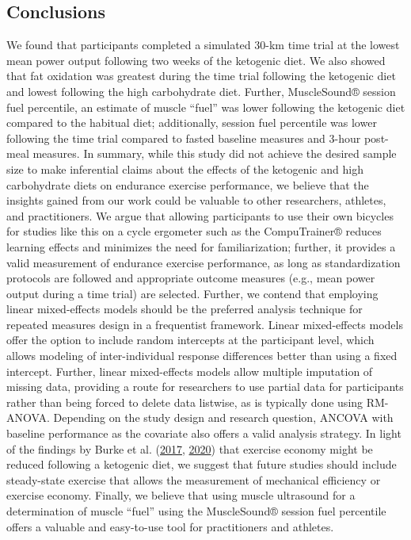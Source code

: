 \documentclass[]{cik}%
\begin{document}
\hypertarget{conclusions}{%
\subsection{Conclusions}\label{conclusions}}

We found that participants completed a simulated 30-km time trial at the
lowest mean power output following two weeks of the ketogenic diet. We
also showed that fat oxidation was greatest during the time trial
following the ketogenic diet and lowest following the high carbohydrate
diet. Further, MuscleSound® session fuel percentile, an estimate of
muscle ``fuel'' was lower following the ketogenic diet compared to the
habitual diet; additionally, session fuel percentile was lower following
the time trial compared to fasted baseline measures and 3-hour post-meal
measures. In summary, while this study did not achieve the desired
sample size to make inferential claims about the effects of the
ketogenic and high carbohydrate diets on endurance exercise performance,
we believe that the insights gained from our work could be valuable to
other researchers, athletes, and practitioners. We argue that allowing
participants to use their own bicycles for studies like this on a cycle
ergometer such as the CompuTrainer® reduces learning effects and
minimizes the need for familiarization; further, it provides a valid
measurement of endurance exercise performance, as long as
standardization protocols are followed and appropriate outcome measures
(e.g., mean power output during a time trial) are selected. Further, we
contend that employing linear mixed-effects models should be the
preferred analysis technique for repeated measures design in a
frequentist framework. Linear mixed-effects models offer the option to
include random intercepts at the participant level, which allows
modeling of inter-individual response differences better than using a
fixed intercept. Further, linear mixed-effects models allow multiple
imputation of missing data, providing a route for researchers to use
partial data for participants rather than being forced to delete data
listwise, as is typically done using RM-ANOVA. Depending on the study
design and research question, ANCOVA with baseline performance as the
covariate also offers a valid analysis strategy. In light of the
findings by Burke et al. (\protect\hyperlink{ref-19}{2017},
\protect\hyperlink{ref-20}{2020}) that exercise economy might be reduced
following a ketogenic diet, we suggest that future studies should
include steady-state exercise that allows the measurement of mechanical
efficiency or exercise economy. Finally, we believe that using muscle
ultrasound for a determination of muscle ``fuel'' using the MuscleSound®
session fuel percentile offers a valuable and easy-to-use tool for
practitioners and athletes.
\end{document}
